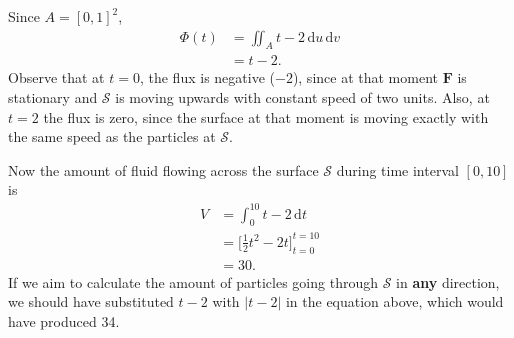 \documentclass[10pt]{article}
\newcommand{\F}{\mathbf{F}}
\newcommand{\ddt}{\,\mathrm{d}t}
\newcommand{\ddu}{\, \mathrm{d}u}
\newcommand{\ddv}{\, \mathrm{d}v}
\begin{document}
Since $A = \left[ 0, 1 \right]^2$,
\begin{align*}
\Phi(t) &= \iint_A t - 2 \ddu \ddv \\
          &= t - 2.
\end{align*}
Observe that at $t = 0$, the flux is negative ($-2$), since at that moment $\F$ is stationary and $\mathscr{S}$ is moving upwards with constant speed of two units. Also, at $t = 2$ the flux is zero, since the surface at that moment is moving exactly with the same speed as the particles at $\mathscr{S}$.

Now the amount of fluid flowing across the surface $\mathscr{S}$ during time interval $\left[  0, 10 \right]$ is
\begin{align*}
V &= \int_0^{10} t - 2 \ddt  \\
   &= \Big[ \frac{1}{2} t^2 - 2t \Big]_{t = 0}^{t = 10} \\
   &= 30.
\end{align*} 
If we aim to calculate the amount of particles going through $\mathscr{S}$ in \textbf{any} direction, we should have substituted $t - 2$ with $|t - 2|$ in the equation above, which would have produced 34.
\end{document}

